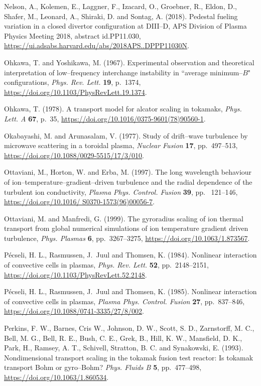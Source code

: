 \documentclass[a4paper,openany,12pt]{book}
\begin{document}
{\begin{thebibliography}{100}
\bibitem{}
Nelson, A., Kolemen, E., Laggner, F., Izacard, O., Groebner, R., Eldon, D., Shafer, M., Leonard, A., Shiraki, D. and Sontag, A. (2018). Pedestal fueling variation in a closed divertor configuration at DIII--D, APS Division of Plasma Physics Meeting 2018, abstract id.PP11.030, \url{https://ui.adsabs.harvard.edu/abs/2018APS..DPPP11030N}.

\bibitem{}
Ohkawa, T. and Yoshikawa, M. (1967). Experimental observation and theoretical interpretation of low--frequency interchange instability in ``average minimum--$B$" configurations, \emph{Phys. Rev. Lett.} \textbf{19}, p.~1374,
\url{https://doi.org/10.1103/PhysRevLett.19.1374}.

\bibitem{}
Ohkawa, T. (1978). A transport model for alcator scaling in tokamaks, \emph{Phys. Lett. A} \textbf{67}, p.~35, 
\url{https://doi.org/10.1016/0375-9601(78)90560-1}.

\bibitem{}
Okabayashi, M. and Arunasalam, V. (1977). Study of drift--wave turbulence by microwave scattering in a toroidal plasma, \emph{Nuclear Fusion} \textbf{17}, pp.~497--513, \url{https://doi.org/10.1088/0029-5515/17/3/010}.

\bibitem{}
Ottaviani, M., Horton, W. and Erba, M. (1997). The long wavelength behaviour of ion--temperature--gradient--driven turbulence and the radial dependence of the turbulent ion conductivity, \emph{Plasma Phys. Control. Fusion} \textbf{39}, pp.~ 121--146, \url{https://doi.org/10.1016/ S0370-1573(96)00056-7}.

\bibitem{}
Ottaviani, M. and Manfredi, G. (1999). The gyroradius scaling of ion thermal transport from global numerical simulations of ion temperature gradient driven turbulence, {\em Phys. Plasmas} \textbf{6}, pp.~3267--3275, \url{https://doi.org/10.1063/1.873567}.

\bibitem{}
P\'ecseli, H. L., Rasmussen, J.~Juul and Thomsen, K. (1984). Nonlinear interaction of convective cells in plasmas,
 {\em Phys. Rev. Lett.} \textbf{52}, pp.~2148--2151, \url{https://doi.org/10.1103/PhysRevLett.52.2148}.

\bibitem{}
P\'ecseli, H. L., Rasmussen, J.~Juul and Thomsen, K. (1985). Nonlinear interaction of convective cells in plasmas, \emph{Plasma Phys. Control. Fusion} \textbf{27}, pp.~837--846, \url{https://doi.org/10.1088/0741-3335/27/8/002}.

\bibitem{}
Perkins, F. W., Barnes, Cris W., Johnson, D. W., Scott, S. D., Zarnstorff, M. C., Bell, M. G., Bell, R. E., Bush, C. E., Grek, B., Hill, K. W., Mansfield, D. K., Park, H., Ramsey, A. T., Schivell, Stratton, B. C. and Synakowski, E. (1993). Nondimensional transport scaling in the tokamak fusion test reactor: Is tokamak transport Bohm or gyro--Bohm? 
{\em Phys. Fluids B} \textbf{5}, pp.~477--498, \url{https://doi.org/10.1063/1.860534}.


\end{thebibliography}}
\end{document}
